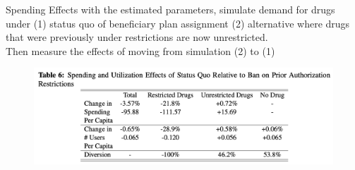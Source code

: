 \begin{frame}{Spending Effects}
    with the estimated parameters, simulate demand for drugs under (1) status quo of beneficiary plan assignment (2) alternative where drugs that were previously under restrictions are now unrestricted. \\
    Then measure the effects of moving from simulation (2) to (1)
    \begin{figure}
        \centering
        \includegraphics[width=0.8\linewidth]{tb6-spending-effect.png}
    \end{figure}
\end{frame}
